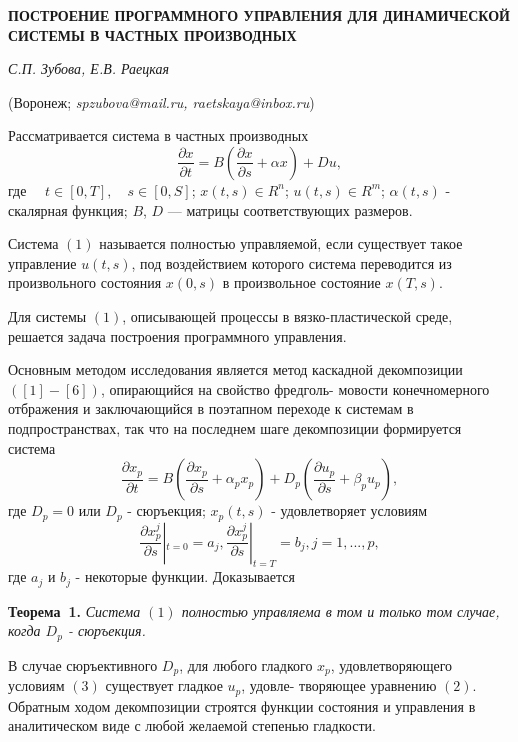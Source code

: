 \begin{center}
    {\bf ПОСТРОЕНИЕ ПРОГРАММНОГО  УПРАВЛЕНИЯ ДЛЯ ДИНАМИЧЕСКОЙ СИСТЕМЫ В ЧАСТНЫХ ПРОИЗВОДНЫХ}

    {\it С.П. Зубова, Е.В. Раецкая}

    (Воронеж; {\it spzubova@mail.ru, \it raetskaya@inbox.ru})

\end{center}


 Рассматривается система в частных производных
\begin{equation}
\frac{\partial x}{\partial t}=B(\frac{\partial x}{\partial s}+ \alpha  x) + Du,
\end{equation}
 где $\quad t\in [0,T],\quad s\in [0,S]$;     $x(t,s)\in R ^{n}$; $u(t,s)\in R^{m}$; $\alpha(t,s)$ - скалярная функция; $B$, $D$ --- матрицы соответствующих  размеров.

Система $(1)$ называется полностью управляемой, если существует такое управление $u(t,s)$,
под воздействием которого система переводится   из произвольного состояния $x(0,s)$ в произвольное состояние $x(T,s)$.

Для системы $(1)$, описывающей  процессы в вязко-пластической среде, решается задача построения программного управления.


Основным методом исследования является метод каскадной декомпозиции $([1]-[6])$, опирающийся на свойство фредголь-
мовости конечномерного отбражения и заключающийся  в поэтапном переходе к системам в подпространствах, так что на
последнем шаге декомпозиции формируется система
\begin{equation}
\frac{\partial x_{p}}{\partial t}=B(\frac{\partial x_{p}}{\partial s}+ \alpha_{p} x_{p}) + D_{p}(\frac{\partial u_{p}}{\partial s}+ \beta_{p}  u_{p}),
\end{equation}
где $D_{p}=0$ или $D_{p}$ - сюръекция;  $x_{p}(t,s)$ - удовлетворяет условиям
\begin{equation}
\frac{\partial x^{j}_{p}}{\partial s}|_{t=0} = a_{j},      \frac{\partial x^{j}_{p}}{\partial s}|_{t=T} = b_{j},    j=1,...,p,
\end{equation}
где  $a_{j}$ и $b_{j}$ - некоторые функции. Доказывается

\textbf{Теорема~1.} {\it Система $(1)$ полностью управляема в том и только том случае, когда  $D_{p}$ - сюръекция.}


В случае сюръективного $D_{p}$, для любого гладкого $x_{p}$, удовлетворяющего
условиям $(3)$ существует гладкое $u_{p}$, удовле-
творяющее уравнению $(2)$. Обратным ходом декомпозиции  строятся функции состояния
и управления в аналитическом виде   с любой желаемой степенью гладкости.

